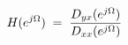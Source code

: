 \documentclass[preview]{standalone}
\begin{document}
\begin{align*}
\special{dvisvgm:raw <g id='unique000'>}H(e^{j\Omega}) \;=\; \frac{D_{yx}(e^{j\Omega})}{D_{xx}(e^{j\Omega})}\special{dvisvgm:raw </g>}
\end{align*}
\end{document}
